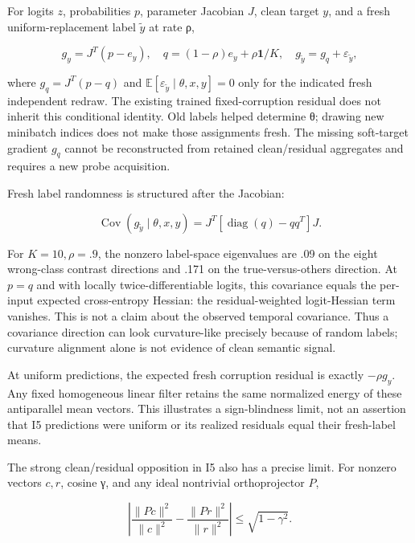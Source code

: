 \documentclass[
  british,
  10pt,
  a4paper,
]{article}
\begin{document}
For logits \(z\), probabilities \(p\), parameter Jacobian \(J\), clean
target \(y\), and a fresh uniform-\allowbreak{}replacement label
\(\tilde y\) at rate ρ,

\[
g_y=J^T(p-e_y),\quad
q=(1-\rho)e_y+\rho\mathbf1/K,\quad
g_{\tilde y}=g_q+\varepsilon_{\tilde y},
\]

where \(g_q=J^T(p-q)\) and
\(\mathbb E[\varepsilon_{\tilde y}\mid\theta,x,y]=0\) only for the
indicated fresh independent redraw. The existing trained
fixed-\allowbreak{}corruption residual does not inherit this conditional
identity. Old labels helped determine θ; drawing new minibatch indices
does not make those assignments fresh. The missing
soft-\allowbreak{}target gradient \(g_q\) cannot be reconstructed from
retained clean/\allowbreak{}residual aggregates and requires a new probe
acquisition.\allowbreak{}

Fresh label randomness is structured after the Jacobian:

\[
\operatorname{Cov}(g_{\tilde y}\mid\theta,x,y)
=J^T[\operatorname{diag}(q)-qq^T]J.
\]

For \(K=10,\rho=.9\), the nonzero label-\allowbreak{}space eigenvalues
are .09 on the eight wrong-\allowbreak{}class contrast directions and
.171 on the true-\allowbreak{}versus-\allowbreak{}others direction. At
\(p=q\) and with locally twice-\allowbreak{}differentiab\allowbreak{}le
logits, this covariance equals the per-input expected
cross-\allowbreak{}entropy Hessian: the residual-\allowbreak{}weighted
logit-\allowbreak{}Hessian term vanishes. This is not a claim about the
observed temporal covariance.\allowbreak{} Thus a covariance direction
can look curvature-\allowbreak{}like precisely because of random labels;
curvature alignment alone is not evidence of clean semantic signal.

At uniform predictions,\allowbreak{} the expected fresh corruption
residual is exactly \(-\rho g_y\). Any fixed homogeneous linear filter
retains the same normalized energy of these antiparallel mean vectors.
This illustrates a sign-\allowbreak{}blindness limit, not an assertion
that I5 predictions were uniform or its realized residuals equal their
fresh-\allowbreak{}label means.

The strong clean/\allowbreak{}residual opposition in I5 also has a
precise limit. For nonzero vectors \(c,r\), cosine γ, and any ideal
nontrivial orthoprojector \(P\),

\[
\left|
\frac{\|Pc\|^2}{\|c\|^2}-
\frac{\|Pr\|^2}{\|r\|^2}
\right|\le\sqrt{1-\gamma^2}.
\]
\end{document}
